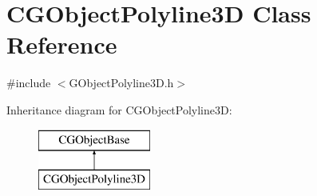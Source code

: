 \hypertarget{class_c_g_object_polyline3_d}{}\section{C\+G\+Object\+Polyline3\+D Class Reference}
\label{class_c_g_object_polyline3_d}


{\ttfamily \#include $<$G\+Object\+Polyline3\+D.\+h$>$}

Inheritance diagram for C\+G\+Object\+Polyline3\+D\+:\begin{figure}[H]
\begin{center}
\leavevmode
\includegraphics[height=2.000000cm]{class_c_g_object_polyline3_d}
\end{center}
\end{figure}
